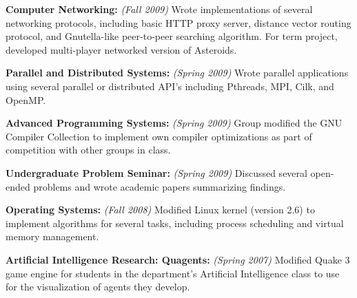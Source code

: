 \documentclass[letterpaper]{resume}
\begin{document}
\begin{compactitem}
	\item \textbf{Computer Networking:} \textit{(Fall 2009)} Wrote implementations of several networking protocols, including basic HTTP proxy server, distance vector routing protocol, and Gnutella-like peer-to-peer searching algorithm. For term project, developed multi-player networked version of Asteroids. \par
	
	\item \textbf{Parallel and Distributed Systems:} \textit{(Spring 2009)} Wrote parallel applications using several parallel or distributed API's including Pthreads, MPI, Cilk, and OpenMP. \par

	\item \textbf{Advanced Programming Systems:} \textit{(Spring 2009)} Group modified the GNU Compiler Collection to implement own compiler optimizations as part of competition with other groups in class. \par

	\item \textbf{Undergraduate Problem Seminar:} \textit{(Spring 2009)} Discussed several open-ended problems and wrote academic papers summarizing findings. \par
	
	\item \textbf{Operating Systems:} \textit{(Fall 2008)} Modified Linux kernel (version 2.6) to implement algorithms for several tasks, including process scheduling and virtual memory management. \par
	
	\item \textbf{Artificial Intelligence Research: Quagents:} \textit{(Spring 2007)} Modified Quake 3 game engine for students in the department's Artificial Intelligence class to use for the visualization of agents they develop. \par
\end{compactitem}
\end{document}
